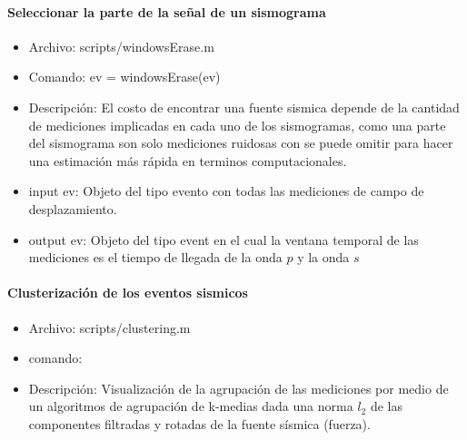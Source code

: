 \paragraph{Seleccionar la parte de la señal de un sismograma}
\begin{itemize}
  \item Archivo: scripts/windowsErase.m
  \item Comando: ev =  windowsErase(ev)
  \item Descripción: El costo de encontrar una fuente sismica depende de la
  cantidad de mediciones implicadas en cada uno de los sismogramas, como una
  parte del sismograma son solo mediciones ruidosas con se puede omitir para
  hacer una estimación más rápida en terminos computacionales.
  \item input ev: Objeto del tipo evento con todas las mediciones de campo de
  desplazamiento.
  \item output ev: Objeto del tipo event en el cual la ventana temporal de las
  mediciones es el tiempo de llegada de la onda $p$ y la onda $s$
\end{itemize}

\paragraph{Clusterización de los eventos sismicos}
 \begin{itemize}
   \item Archivo: scripts/clustering.m
   \item comando: 
   \item Descripción: Visualización de la agrupación de las mediciones por medio
   de un algoritmos de agrupación de k-medias dada una norma $l_2$ de las
   componentes filtradas y rotadas de la fuente sísmica (fuerza).
 \end{itemize}

